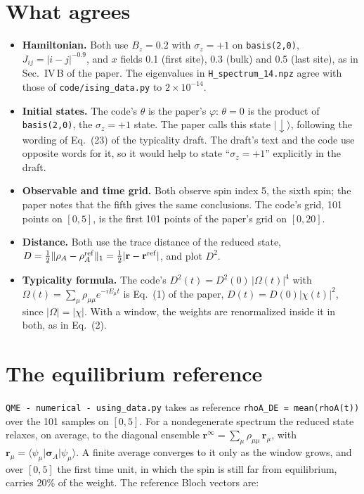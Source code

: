 \documentclass[11pt]{article}
\newcommand{\code}[1]{\texttt{#1}}
\begin{document}
\section{What agrees}\label{sec:agree}
\begin{itemize}\setlength{\itemsep}{2pt}
\item \textbf{Hamiltonian.} Both use $B_z=0.2$ with $\sigma_z=+1$ on \code{basis(2,0)}, $J_{ij}=|i-j|^{-0.9}$, and $x$ fields 0.1 (first site), 0.3 (bulk) and 0.5 (last site), as in Sec.~IV\,B of the paper. The eigenvalues in \code{H\_spectrum\_14.npz} agree with those of \code{code/ising\_data.py} to $2\times10^{-14}$.
\item \textbf{Initial states.} The code's $\theta$ is the paper's $\varphi$: $\theta=0$ is the product of \code{basis(2,0)}, the $\sigma_z=+1$ state. The paper calls this state $|{\downarrow}\rangle$, following the wording of Eq.~(23) of the typicality draft. The draft's text and the code use opposite words for it, so it would help to state ``$\sigma_z=+1$'' explicitly in the draft.
\item \textbf{Observable and time grid.} Both observe spin index 5, the sixth spin; the paper notes that the fifth gives the same conclusions. The code's grid, 101 points on $[0,5]$, is the first 101 points of the paper's grid on $[0,20]$.
\item \textbf{Distance.} Both use the trace distance of the reduced state, $D=\tfrac12\|\rho_A-\rho_A^{\rm ref}\|_1=\tfrac12|\mathbf r-\mathbf r^{\rm ref}|$, and plot $D^2$.
\item \textbf{Typicality formula.} The code's $D^2(t)=D^2(0)\,|\Omega(t)|^4$ with $\Omega(t)=\sum_\mu\rho_{\mu\mu}e^{-iE_\mu t}$ is Eq.~(1) of the paper, $D(t)=D(0)|\chi(t)|^2$, since $|\Omega|=|\chi|$. With a window, the weights are renormalized inside it in both, as in Eq.~(2).
\end{itemize}

\section{The equilibrium reference}\label{sec:ref}
\code{QME - numerical - using\_data.py} takes as reference \code{rhoA\_DE = mean(rhoA(t))} over the 101 samples on $[0,5]$. For a nondegenerate spectrum the reduced state relaxes, on average, to the diagonal ensemble $\mathbf r^\infty=\sum_\mu\rho_{\mu\mu}\,\mathbf r_\mu$, with $\mathbf r_\mu=\langle\psi_\mu|\boldsymbol\sigma_A|\psi_\mu\rangle$. A finite average converges to it only as the window grows, and over $[0,5]$ the first time unit, in which the spin is still far from equilibrium, carries 20\% of the weight. The reference Bloch vectors are:
\end{document}

